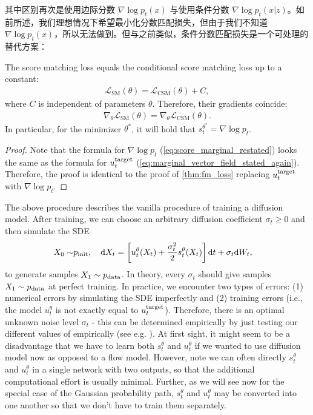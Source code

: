 其中区别再次是使用边际分数 $\nabla\log p_t(x)$ 与使用条件分数 $\nabla\log p_t(x|z)$。如前所述，我们理想情况下希望最小化分数匹配损失，但由于我们不知道 $\nabla\log p_t(x)$，所以无法做到。但与之前类似，条件分数匹配损失是一个可处理的替代方案：
\begin{theorem}
\label{thm:dsm_loss}
The score matching loss equals the conditional score matching loss up to a constant:
\begin{align*}
\mathcal{L}_{\text{SM}}(\theta) = \mathcal{L}_{\text{CSM}}(\theta) + C,
\end{align*}
where $C$ is independent of parameters $\theta$. Therefore, their gradients coincide:
\begin{align*}
\nabla_\theta \mathcal{L}_{\text{SM}}(\theta) = \nabla_\theta \mathcal{L}_{\text{CSM}}(\theta).
\end{align*}
In particular, for the minimizer $\theta^*$, it will hold that $s_t^{\theta^*}=\nabla\log p_t$. 
\end{theorem}
\begin{proof}
Note that the formula for $\nabla\log p_t$ (\cref{eq:score_marginal_restated}) looks the same as the formula for $u^{\text{target}}_t$ (\cref{eq:marginal_vector_field_stated_again}). Therefore, the proof is identical to the proof of \cref{thm:fm_loss} replacing $u^{\text{target}}_t$ with $\nabla\log p_t$.
\end{proof}
The above procedure describes the vanilla procedure of training a diffusion model. After training, we can choose an arbitrary diffusion coefficient $\sigma_t\geq 0$ and then simulate the SDE
\begin{align}
\label{eq:sde_extension_restated}
    X_0\sim&p_{\rm{init}},\quad \mathrm{d} X_t =\left[u_t^\theta(X_t)+\frac{\sigma_t^2}{2}s_t^\theta(X_t)\right]\mathrm{d} t +\sigma_t\mathrm{d} W_t,
\end{align}
to generate samples $X_1\sim p_{\rm{data}}$. In theory, every $\sigma_t$ should give samples $X_1\sim p_{\rm{data}}$ at perfect training. In practice, we encounter two types of errors: (1) numerical errors by simulating the SDE imperfectly and (2) training errors (i.e., the model $u_t^{\theta}$ is not exactly equal to $u^{\text{target}}_t$). Therefore, there is an optimal unknown noise level $\sigma_t$ - this can be determined empirically by just testing our different values of empirically (see e.g. \citep{albergo2023stochastic,karras2022elucidating,ma2024sit}). At first sight, it might seem to be a disadvantage that we have to learn both $s_t^\theta$ and $u_t^\theta$ if we wanted to use diffusion model now as opposed to a flow model. However, note we can often directly $s_t^\theta$ and $u_t^\theta$ in a single network with two outputs, so that the additional computational effort is usually minimal. Further, as we will see now for the special case of the Gaussian probability path, $s_t^\theta$ and $u_t^\theta$ may be converted into one another so that we don't have to train them separately.

